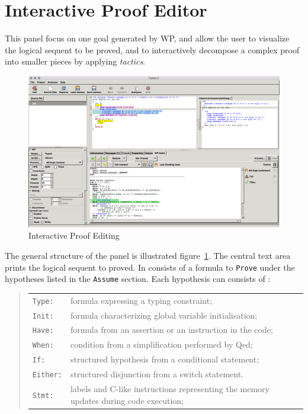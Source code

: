 \clearpage
\section{Interactive Proof Editor}
\label{wp-proof-editor}

This panel focus on one goal generated by \textsf{WP}, and allow the user to visualize the logical sequent to be proved, and to interactively decompose a complex proof into smaller pieces by applying \emph{tactics}.

\begin{figure}[htbp]
\begin{center}
\includegraphics[width=\textwidth]{wp-tip-run.png}
\end{center}
\caption{Interactive Proof Editing}
\label{wp-tip-run}
\end{figure}

The general structure of the panel is illustrated figure~\ref{wp-tip-run}. The central text area prints the logical sequent to proved. In consists of a formula to \verb+Prove+ under the hypotheses listed in the \verb+Assume+ section. Each hypothesis can consists of :
\begin{quote}
\begin{tabular}{ll}
\verb+Type:+& formula expressing a typing constraint;\\
\verb+Init:+& formula characterizing global variable initialisation;\\
\verb+Have:+& formula from an assertion or an instruction in the code;\\
\verb+When:+& condition from a simplification performed by \textsf{Qed};\\
\verb+If:+& structured hypothesis from a conditional statement;\\
\verb+Either:+& structured disjunction from a switch statement.\\
\verb+Stmt:+& labels and C-like instructions representing the memory updates during code execution;\\
\end{tabular}
\end{quote}

